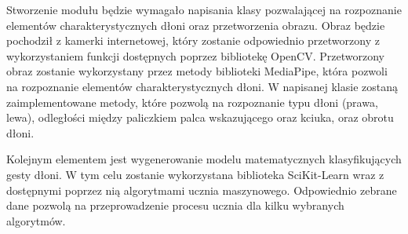 \quad Stworzenie modułu będzie wymagało napisania klasy pozwalającej na rozpoznanie elementów charakterystycznych dłoni oraz przetworzenia obrazu. Obraz będzie pochodził z kamerki internetowej, który zostanie odpowiednio przetworzony z wykorzystaniem funkcji dostępnych poprzez bibliotekę OpenCV. Przetworzony obraz zostanie wykorzystany przez metody biblioteki MediaPipe, która pozwoli na rozpoznanie elementów charakterystycznych dłoni. W napisanej klasie zostaną zaimplementowane metody, które pozwolą na rozpoznanie typu dłoni (prawa, lewa), odległości między paliczkiem palca wskazującego oraz kciuka, oraz obrotu dłoni. 

\quad Kolejnym elementem jest wygenerowanie modelu matematycznych klasyfikujących gesty dłoni. W tym celu zostanie wykorzystana biblioteka SciKit-Learn wraz z dostępnymi poprzez nią algorytmami ucznia maszynowego. Odpowiednio zebrane dane pozwolą na przeprowadzenie procesu ucznia dla kilku wybranych algorytmów. 





